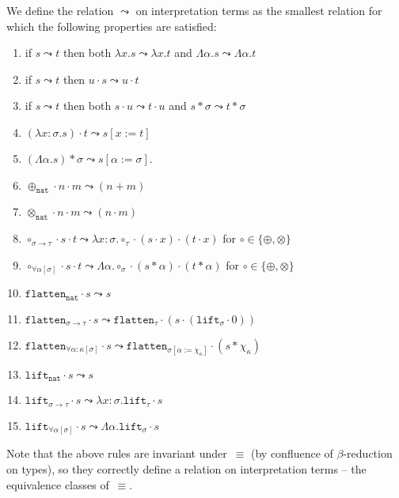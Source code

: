 \documentclass[runningheads,a4paper]{llncs}
\newcommand{\quant}[2]{\forall #1[#2]}
\newcommand{\arrtype}{\rightarrow}
\newcommand{\abs}[2]{\lambda #1.#2}
\newcommand{\tabs}[2]{\Lambda #1.#2}
\newcommand{\app}[2]{#1 \cdot #2}
\newcommand{\tapp}[2]{#1 * #2}
\newcommand{\subst}[2]{#1:=#2}
\newcommand{\nat}{\mathtt{nat}}
\newcommand{\flatten}{\mathtt{flatten}}
\newcommand{\lift}{\mathtt{lift}}
\begin{document}
\begin{definition}
  We define the relation $\leadsto$ on interpretation terms as the
  smallest relation for which the following properties are satisfied:
  \begin{enumerate}
  \item\label{leadsto:mono:abs}
    if $s \leadsto t$ then both $\abs{x}{s} \leadsto \abs{x}{t}$ and
    $\tabs{\alpha}{s} \leadsto \tabs{\alpha}{t}$
  \item\label{leadsto:mono:right}
    if $s \leadsto t$ then $\app{u}{s} \leadsto \app{u}{t}$
  \item\label{leadsto:mono:left}
    if $s \leadsto t$ then both $\app{s}{u} \leadsto \app{t}{u}$ and
    $\tapp{s}{\sigma} \leadsto \tapp{t}{\sigma}$
  \item\label{leadsto:beta:abs} $\app{(\abs{x:\sigma}{s})}{t} \leadsto
    s[\subst{x}{t}]$
  \item\label{leadsto:beta:tabs} $\tapp{(\tabs{\alpha}{s})}{\sigma}
    \leadsto s[\subst{\alpha}{\sigma}]$.
  \item\label{leadsto:plus:base}
    $\app{\app{\oplus_{\nat}}{n}}{m} \leadsto (n+m)$
  \item\label{leadsto:times:base} $\app{\app{\otimes_{\nat}}{n}}{m}
    \leadsto (n \cdot m)$
  \item\label{leadsto:circ:arrow} $\app{\app{\circ_{\sigma \arrtype
        \tau}}{s}}{t} \leadsto
    \abs{x:\sigma}{\app{\app{\circ_\tau}{(\app{s}{x})}}{(\app{t}{x})}}$
    for $\circ \in \{ \oplus, \otimes \}$
  \item\label{leadsto:circ:forall}
    $\app{\app{\circ_{\quant{\alpha}{\sigma}}}{s}}{t} \leadsto
    \tabs{\alpha}{\app{\app{\circ_\sigma}{(\tapp{s}{\alpha})}}{(
        \tapp{t}{\alpha})}}$ for $\circ \in \{ \oplus, \otimes \}$
  \item $\app{\flatten_\nat}{s} \leadsto s$
  \item $\app{\flatten_{\sigma \arrtype \tau}}{s} \leadsto
    \app{\flatten_\tau}{(\app{s}{(\app{\lift_\sigma}{0})})}$
  \item $\app{\flatten_{\quant{\alpha:\kappa}{\sigma}}}{s} \leadsto
    \app{\flatten_{\sigma[\subst{\alpha}{\chi_\kappa}]}}{(\tapp{s}{\chi_\kappa})}$
  \item $\app{\lift_\nat}{s} \leadsto s$
  \item $\app{\lift_{\sigma \arrtype \tau}}{s} \leadsto
    \abs{x:\sigma}{\app{\lift_{\tau}}{s}}$
  \item $\app{\lift_{\quant{\alpha}{\sigma}}}{s} \leadsto
    \tabs{\alpha}{\app{\lift_{\sigma}}{s}}$
  \end{enumerate}
  Note that the above rules are invariant under~$\equiv$ (by
  confluence of $\beta$-reduction on types), so they correctly define
  a relation on interpretation terms -- the equivalence classes
  of~$\equiv$.


\end{definition}
\end{document}
